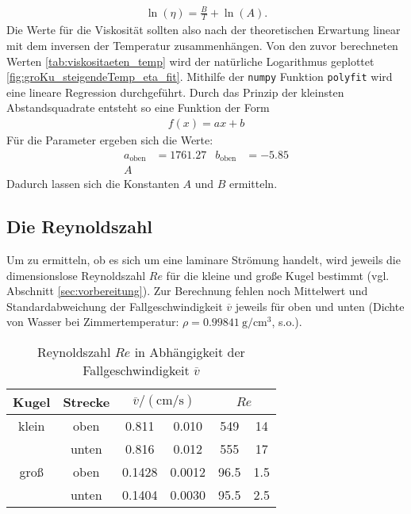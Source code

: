 \begin{align}
    \ln {\left( \eta \right)} = \frac{B}{T} + \ln{\left( A \right)}.
\end{align}
Die Werte für die Viskosität sollten also nach der theoretischen Erwartung linear mit dem inversen der Temperatur zusammenhängen.
Von den zuvor berechneten Werten \ref{tab:viskositaeten_temp} wird der natürliche Logarithmus geplottet \ref{fig:groKu_steigendeTemp_eta_fit}.
Mithilfe der \texttt{numpy} Funktion \texttt{polyfit} wird eine lineare Regression durchgeführt.
Durch das Prinzip der kleinsten Abstandsquadrate entsteht so eine Funktion der Form
\begin{align*}
    f(x) = ax + b
\end{align*}
Für die Parameter ergeben sich die Werte:
\begin{align*}
    a_\text{oben} &= 1761.27 & b_\text{oben} &= -5.85 \\
    A
\end{align*}
Dadurch lassen sich die Konstanten $A$ und $B$ ermitteln.


\subsection[]{Die Reynoldszahl}
Um zu ermitteln, ob es sich um eine laminare Strömung handelt, wird jeweils die dimensionslose Reynoldszahl $Re$ für die kleine und große Kugel bestimmt
(vgl. Abschnitt \ref{sec:vorbereitung}).
Zur Berechnung fehlen noch Mittelwert und Standardabweichung der Fallgeschwindigkeit $\overline{v}$ jeweils für oben und unten
(Dichte von Wasser bei Zimmertemperatur: $\rho = \qty{0.99841}{\g \per \cm^3}$, s.o.).

\begin{table}
    \caption[]{Reynoldszahl $Re$ in Abhängigkeit der Fallgeschwindigkeit $\overline{v}$}
    \label{tab:reynold}
    \centering
    \begin{tabular}[]{S S S[table-format=1.4] @{${}\pm{}$} S[table-format=1.4] S[table-format=4.1] @{${}\pm{}$} S[table-format=3.1]}
        \toprule
        {Kugel} & {Strecke} &  &  \\
        \bottomrule
        {klein} & {oben} & 0.811 & 0.010 & 549 & 14 \\
         & {unten} & 0.816 & 0.012 & 555 & 17 \\
        {groß} & {oben} & 0.1428 & 0.0012 & 96.5 & 1.5 \\
         & {unten} & 0.1404 & 0.0030 & 95.5 & 2.5 \\
    \end{tabular}
\end{table}


